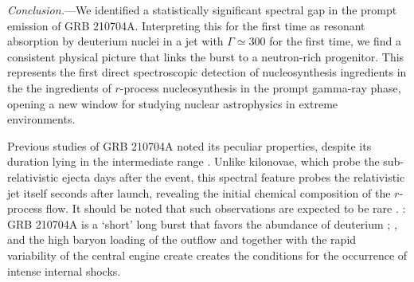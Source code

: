 \documentclass[prd,twocolumn,amsmath,amssymb,aps,linenumbers]{revtex4-2} %
\providecommand{\DIFaddtex}[1]{{\protect\color{blue} \sf #1}} %
\providecommand{\DIFdeltex}[1]{{\protect\color{red} \scriptsize #1}} %
\providecommand{\DIFaddbegin}{} %
\providecommand{\DIFaddend}{} %
\providecommand{\DIFdelbegin}{} %
\providecommand{\DIFdelend}{} %
\providecommand{\DIFadd}[1]{\texorpdfstring{\DIFaddtex{#1}}{#1}} %
\providecommand{\DIFdel}[1]{\texorpdfstring{\DIFdeltex{#1}}{}} %
\newcommand{\DIFscaledelfig}{0.5}
\newlength{\DIFdelgraphicswidth} %
\newlength{\DIFdelgraphicsheight} %
\newcommand{\DIFaddincludegraphics}[2][]{{\color{blue}\fbox{\DIFOincludegraphics[#1]{#2}}}} %
\newcommand{\DIFdelincludegraphics}[2][]{%
\sbox{\DIFdelgraphicsbox}{\DIFOincludegraphics[#1]{#2}}%
\settoboxwidth{\DIFdelgraphicswidth}{\DIFdelgraphicsbox} %
\settoboxtotalheight{\DIFdelgraphicsheight}{\DIFdelgraphicsbox} %
\scalebox{\DIFscaledelfig}{%
\parbox[b]{\DIFdelgraphicswidth}{\usebox{\DIFdelgraphicsbox}\\[-\baselineskip] \rule{\DIFdelgraphicswidth}{0em}}\llap{\resizebox{\DIFdelgraphicswidth}{\DIFdelgraphicsheight}{%
\setlength{\unitlength}{\DIFdelgraphicswidth}%
\begin{picture}(1,1)%
\thicklines\linethickness{2pt} %
{\color[rgb]{1,0,0}\put(0,0){\framebox(1,1){}}}%
{\color[rgb]{1,0,0}\put(0,0){\line( 1,1){1}}}%
{\color[rgb]{1,0,0}\put(0,1){\line(1,-1){1}}}%
\end{picture}%
}\hspace*{3pt}}} %
} %
\DeclareRobustCommand{\DIFaddbegin}{\DIFOaddbegin \let\includegraphics\DIFaddincludegraphics} %
\DeclareRobustCommand{\DIFaddend}{\DIFOaddend \let\includegraphics\DIFOincludegraphics} %
\DeclareRobustCommand{\DIFdelbegin}{\DIFOdelbegin \let\includegraphics\DIFdelincludegraphics} %
\DeclareRobustCommand{\DIFdelend}{\DIFOaddend \let\includegraphics\DIFOincludegraphics} %
\begin{document}
\textit{Conclusion.}---We identified a statistically significant spectral gap in the prompt emission of GRB 210704A. Interpreting this \DIFaddbegin \DIFadd{for the first time }\DIFaddend as resonant absorption by deuterium nuclei in a jet with $\Gamma\simeq 300$\DIFdelbegin \DIFdel{for the first time}\DIFdelend , we find a consistent physical picture that links the burst to a neutron-rich progenitor. This represents the first direct spectroscopic detection of \DIFdelbegin \DIFdel{nucleosynthesis ingredients in the }\DIFdelend \DIFaddbegin \DIFadd{the ingredients of }\DIFaddend $r$-process \DIFaddbegin \DIFadd{nucleosynthesis }\DIFaddend in the prompt gamma-ray phase, opening a new window for studying nuclear astrophysics in extreme environments.


Previous studies of GRB 210704A noted its peculiar properties, despite its duration lying in the intermediate range \citep{2021GCN.30380....1M, 2023MNRAS.522.5204B, 2026MNRAS.548ag555P}. %
Unlike kilonovae, which probe the sub-relativistic ejecta days after the event, this spectral feature probes the relativistic jet itself seconds after launch, revealing the initial chemical composition of the $r$-process flow. It should be noted that such observations are expected to be rare\DIFdelbegin \DIFdel{. }\DIFdelend \DIFaddbegin \DIFadd{: }\DIFaddend GRB 210704A is a `short' long burst that favors the abundance of deuterium\DIFdelbegin \DIFdel{; }\DIFdelend \DIFaddbegin \DIFadd{, and }\DIFaddend the high baryon loading of the outflow \DIFdelbegin \DIFdel{and }\DIFdelend \DIFaddbegin \DIFadd{together with the }\DIFaddend rapid variability of the central engine \DIFdelbegin \DIFdel{create }\DIFdelend \DIFaddbegin \DIFadd{creates the }\DIFaddend conditions for the occurrence of intense internal shocks.




\end{document}
